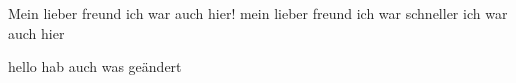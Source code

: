 
Mein lieber freund ich war auch hier!
mein lieber freund ich war schneller ich war auch hier





hello hab auch was geändert

